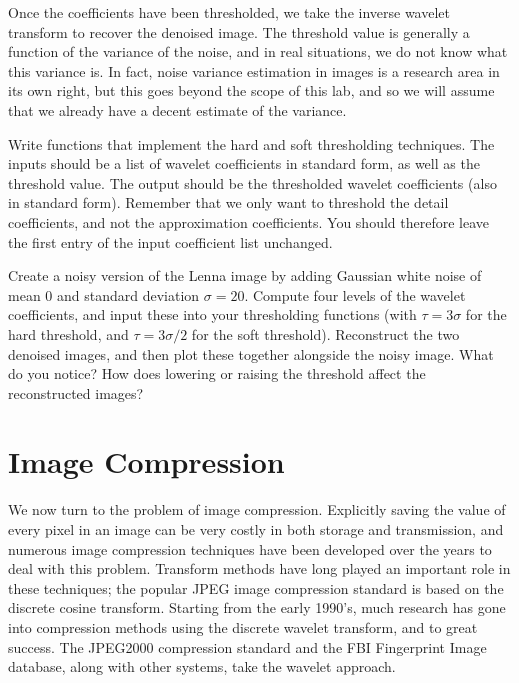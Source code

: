 Once the coefficients have been thresholded, we take the inverse
wavelet transform to recover the denoised image. The threshold
value is generally a function of the variance of the noise,
and in real situations, we do not know what this variance is. In fact,
noise variance estimation in images is a research area in its own
right, but this goes beyond the scope of this lab, and so we will
assume that we already have a decent estimate of the variance.

\begin{problem}
Write functions that implement the hard and soft thresholding
techniques. The inputs should be a list of wavelet coefficients
in standard form, as well as the threshold value. The output
should be the thresholded wavelet coefficients (also in
standard form). Remember that we only want to threshold the
detail coefficients, and not the approximation coefficients.
You should therefore leave the first entry of the input
coefficient list unchanged.
\end{problem}
\begin{problem}
Create a noisy version of the Lenna image by adding Gaussian
white noise of mean 0 and standard deviation $\sigma = 20$. Compute four
levels of the wavelet coefficients, and input these into your
thresholding functions (with $\tau = 3\sigma$ for the hard threshold,
and $\tau = 3\sigma/2$ for the soft threshold). Reconstruct the
two denoised images, and then plot these together alongside the
noisy image. What do you notice? How does lowering or raising the
threshold affect the reconstructed images?
\end{problem}

\section*{Image Compression}
We now turn to the problem of image compression. Explicitly saving
the value of every pixel in an image can be very costly in both
storage and transmission, and numerous image compression techniques
have been developed over the years to deal with this problem.
Transform methods have long played an important role in these
techniques; the popular JPEG image compression standard is based on
the discrete cosine transform. Starting from the early 1990's, much
research has gone into compression methods using the discrete wavelet
transform, and to great success. The JPEG2000 compression standard
and the FBI Fingerprint Image database, along with other systems,
take the wavelet approach.


